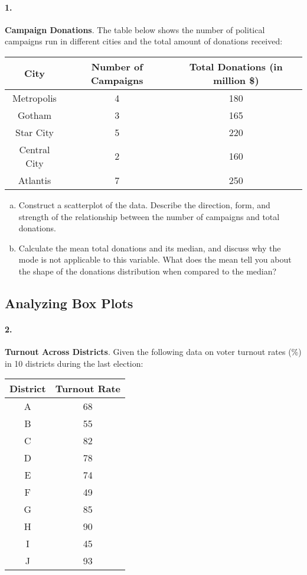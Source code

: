 \documentclass{article}
\begin{document}
\paragraph{1.} \textbf{Campaign Donations}. The table below shows the number of political campaigns run in different cities and the total amount of donations received:
\begin{center}
    \begin{tabular}{|c|c|c|}
    \hline
    City & Number of Campaigns & Total Donations (in million \$) \\
    \hline
    Metropolis & 4 & 180 \\
    Gotham & 3 & 165 \\
    Star City & 5 & 220 \\
    Central City & 2 & 160 \\
    Atlantis & 7 & 250 \\
    \hline
    \end{tabular}
\end{center}

\begin{enumerate}[a)]
    \item Construct a scatterplot of the data. Describe the direction, form, and strength of the relationship between the number of campaigns and total donations.
    \item Calculate the mean total donations and its median, and discuss why the mode is not applicable to this variable. What does the mean tell you about the shape of the donations distribution when compared to the median?
\end{enumerate}


\subsection*{Analyzing Box Plots}
\paragraph{2.} \textbf{Turnout Across Districts}. Given the following data on voter turnout rates (\%) in 10 districts during the last election:
\begin{center}
    \begin{tabular}{|c|c|}
    \hline
    District & Turnout Rate \\
    \hline
    A & 68 \\
    B & 55 \\
    C & 82 \\
    D & 78 \\
    E & 74 \\
    F & 49 \\
    G & 85 \\
    H & 90 \\
    I & 45 \\
    J & 93 \\
    \hline
    \end{tabular}
\end{center}
\end{document}
